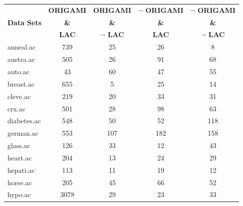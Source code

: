 \begin{table}[htbp]
	\centering
		\begin{tabular}{|l|c|c|c|c|}
		\hline
				& \textbf{ORIGAMI}	& \textbf{ORIGAMI}		& \textbf{$\neg$ ORIGAMI}	& \textbf{$\neg$ ORIGAMI}	\\
		\textbf{Data Sets}	& \textbf{\&}		& \textbf{\&}			& \textbf{\&}			& \textbf{\&}			\\
				&  \textbf{LAC}		& \textbf{$\neg$ LAC}		& \textbf{LAC}			& \textbf{$\neg$ LAC}		\\
		\hline
		anneal.ac       & 739           & 25                 & 26                       & 8                             \\
		\hline
		austra.ac       & 505           & 26                 & 91                       & 68                            \\
		\hline
		auto.ac         & 43            & 60                 & 47                       & 55                            \\
		\hline
		breast.ac       & 655           & 5                  & 25                       & 14                            \\
		\hline
		cleve.ac        & 219           & 20                 & 33                       & 31                            \\
		\hline
		crx.ac          & 501           & 28                 & 98                       & 63                            \\
		\hline
		diabetes.ac     & 548           & 50                 & 52                       & 118                           \\
		\hline
		german.ac       & 553           & 107                & 182                      & 158                           \\
		\hline
		glass.ac        & 126           & 33                 & 12                       & 43                            \\
		\hline
		heart.ac        & 204           & 13                 & 24                       & 29                            \\
		\hline
		hepati.ac       & 113           & 11                 & 19                       & 12                            \\
		\hline
		horse.ac        & 205           & 45                 & 66                       & 52                            \\
		\hline
		hypo.ac         & 3078          & 29                 & 23                       & 33                            \\

\end{tabular}
\end{table}
